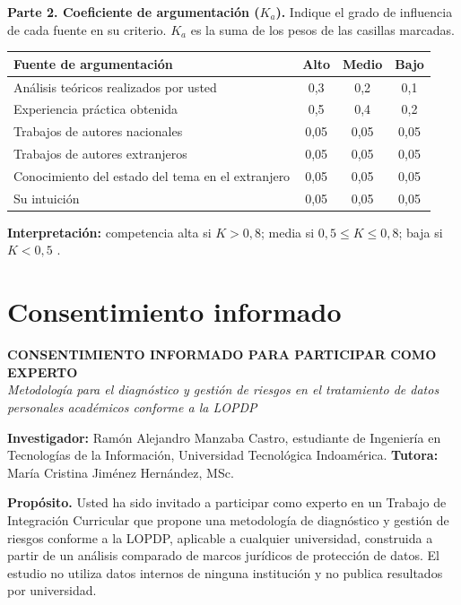 \noindent\textbf{Parte 2. Coeficiente de argumentación ($K_a$).} Indique el grado de influencia de cada fuente en su criterio. $K_a$ es la suma de los pesos de las casillas marcadas.

\begin{center}
\small
\renewcommand{\arraystretch}{1.3}
\begin{tabularx}{\textwidth}{|L|c|c|c|}
  \hline
  \textbf{Fuente de argumentación} & \textbf{Alto} & \textbf{Medio} & \textbf{Bajo} \\
  \hline
  Análisis teóricos realizados por usted & 0,3 & 0,2 & 0,1 \\
  \hline
  Experiencia práctica obtenida & 0,5 & 0,4 & 0,2 \\
  \hline
  Trabajos de autores nacionales & 0,05 & 0,05 & 0,05 \\
  \hline
  Trabajos de autores extranjeros & 0,05 & 0,05 & 0,05 \\
  \hline
  Conocimiento del estado del tema en el extranjero & 0,05 & 0,05 & 0,05 \\
  \hline
  Su intuición & 0,05 & 0,05 & 0,05 \\
  \hline
\end{tabularx}
\end{center}

\noindent\textbf{Interpretación:} competencia alta si $K > 0{,}8$; media si $0{,}5 \le K \le 0{,}8$; baja si $K < 0{,}5$ \cite{cabero2013competencia}.

\section{Consentimiento informado}

\begin{center}
\textbf{CONSENTIMIENTO INFORMADO PARA PARTICIPAR COMO EXPERTO}\\
\textit{Metodología para el diagnóstico y gestión de riesgos en el tratamiento de datos personales académicos conforme a la LOPDP}
\end{center}

\textbf{Investigador:} Ramón Alejandro Manzaba Castro, estudiante de Ingeniería en Tecnologías de la Información, Universidad Tecnológica Indoamérica. \textbf{Tutora:} María Cristina Jiménez Hernández, MSc.

\textbf{Propósito.} Usted ha sido invitado a participar como experto en un Trabajo de Integración Curricular que propone una metodología de diagnóstico y gestión de riesgos conforme a la LOPDP, aplicable a cualquier universidad, construida a partir de un análisis comparado de marcos jurídicos de protección de datos. El estudio no utiliza datos internos de ninguna institución y no publica resultados por universidad.

